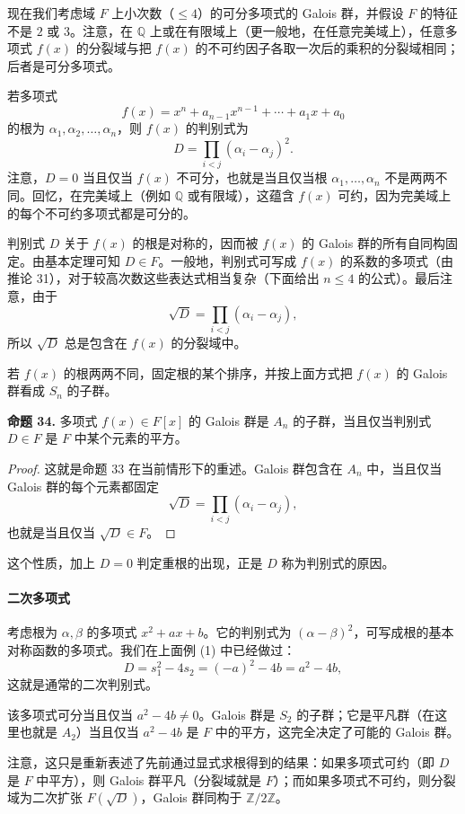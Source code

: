 现在我们考虑域 $F$ 上小次数（$\leq 4$）的可分多项式的 Galois 群，并假设 $F$ 的特征不是 $2$ 或 $3$。注意，在 $\mathbb Q$ 上或在有限域上（更一般地，在任意完美域上），任意多项式 $f(x)$ 的分裂域与把 $f(x)$ 的不可约因子各取一次后的乘积的分裂域相同；后者是可分多项式。

若多项式
\[
f(x)=x^n+a_{n-1}x^{n-1}+\cdots+a_1x+a_0
\]
的根为 $\alpha_1,\alpha_2,\ldots,\alpha_n$，则 $f(x)$ 的判别式为
\[
D=\prod_{i<j}(\alpha_i-\alpha_j)^2.
\]
注意，$D=0$ 当且仅当 $f(x)$ 不可分，也就是当且仅当根 $\alpha_1,\ldots,\alpha_n$ 不是两两不同。回忆，在完美域上（例如 $\mathbb Q$ 或有限域），这蕴含 $f(x)$ 可约，因为完美域上的每个不可约多项式都是可分的。

判别式 $D$ 关于 $f(x)$ 的根是对称的，因而被 $f(x)$ 的 Galois 群的所有自同构固定。由基本定理可知 $D\in F$。一般地，判别式可写成 $f(x)$ 的系数的多项式（由推论 31），对于较高次数这些表达式相当复杂（下面给出 $n\leq 4$ 的公式）。最后注意，由于
\[
\sqrt D=\prod_{i<j}(\alpha_i-\alpha_j),
\]
所以 $\sqrt D$ 总是包含在 $f(x)$ 的分裂域中。

若 $f(x)$ 的根两两不同，固定根的某个排序，并按上面方式把 $f(x)$ 的 Galois 群看成 $S_n$ 的子群。

\noindent\textbf{命题 34.} 多项式 $f(x)\in F[x]$ 的 Galois 群是 $A_n$ 的子群，当且仅当判别式 $D\in F$ 是 $F$ 中某个元素的平方。

\begin{proof}
这就是命题 33 在当前情形下的重述。Galois 群包含在 $A_n$ 中，当且仅当 Galois 群的每个元素都固定
\[
\sqrt D=\prod_{i<j}(\alpha_i-\alpha_j),
\]
也就是当且仅当 $\sqrt D\in F$。
\end{proof}

这个性质，加上 $D=0$ 判定重根的出现，正是 $D$ 称为判别式的原因。

\paragraph{二次多项式}
考虑根为 $\alpha,\beta$ 的多项式 $x^2+ax+b$。它的判别式为 $(\alpha-\beta)^2$，可写成根的基本对称函数的多项式。我们在上面例 (1) 中已经做过：
\[
D=s_1^2-4s_2=(-a)^2-4b=a^2-4b,
\]
这就是通常的二次判别式。

该多项式可分当且仅当 $a^2-4b\neq0$。Galois 群是 $S_2$ 的子群；它是平凡群（在这里也就是 $A_2$）当且仅当 $a^2-4b$ 是 $F$ 中的平方，这完全决定了可能的 Galois 群。

注意，这只是重新表述了先前通过显式求根得到的结果：如果多项式可约（即 $D$ 是 $F$ 中平方），则 Galois 群平凡（分裂域就是 $F$）；而如果多项式不可约，则分裂域为二次扩张 $F(\sqrt D)$，Galois 群同构于 $\mathbb Z/2\mathbb Z$。

